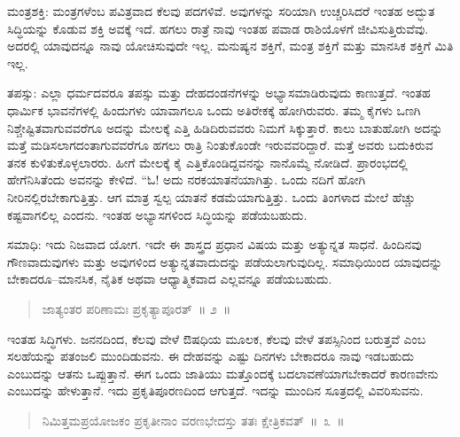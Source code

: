 \vspace{0.2cm}

ಮಂತ್ರಶಕ್ತಿ: ಮಂತ್ರಗಳೆಂಬ ಪವಿತ್ರವಾದ ಕೆಲವು ಪದಗಳಿವೆ. ಅವುಗಳನ್ನು ಸರಿಯಾಗಿ ಉಚ್ಚರಿಸಿದರೆ ಇಂತಹ ಅದ್ಭುತ ಸಿದ್ಧಿಯನ್ನು ಕೊಡುವ ಶಕ್ತಿ ಅವಕ್ಕೆ ಇದೆ. ಹಗಲು ರಾತ್ರೆ ನಾವು ಇಂತಹ ಪವಾಡ ರಾಶಿಯೊಳಗೆ ಜೀವಿಸುತ್ತಿರುವೆವು. ಅದರಲ್ಲಿ ಯಾವುದನ್ನೂ ನಾವು ಯೋಚಿಸುವುದೇ ಇಲ್ಲ. ಮನುಷ್ಯನ ಶಕ್ತಿಗೆ, ಮಂತ್ರ ಶಕ್ತಿಗೆ ಮತ್ತು ಮಾನಸಿಕ ಶಕ್ತಿಗೆ ಮಿತಿ ಇಲ್ಲ. 

\vspace{0.2cm}

ತಪಸ್ಸು: ಎಲ್ಲಾ ಧರ್ಮದವರೂ ತಪಸ್ಸು ಮತ್ತು ದೇಹದಂಡನೆಗಳನ್ನು ಅಭ್ಯಾಸಮಾಡಿರುವುದು ಕಾಣುತ್ತದೆ. ಇಂತಹ ಧಾರ್ಮಿಕ ಭಾವನೆಗಳಲ್ಲಿ ಹಿಂದುಗಳು ಯಾವಾಗಲೂ ಒಂದು ಅತಿರೇಕಕ್ಕೆ ಹೋಗಿರುವರು. ತಮ್ಮ ಕೈಗಳು ಒಣಗಿ ನಿಶ್ಚೇಷ್ಟಿತವಾಗುವವರೆಗೂ ಅದನ್ನು ಮೇಲಕ್ಕೆ ಎತ್ತಿ ಹಿಡಿದಿರುವವರು ನಿಮಗೆ ಸಿಕ್ಕುತ್ತಾರೆ. ಕಾಲು ಬಾತುಹೋಗಿ ಅದನ್ನು ಮತ್ತೆ ಮಡಿಸಲಾಗದಂತಾಗುವವರೆಗೂ ಹಗಲು ರಾತ್ರಿ ನಿಂತುಕೊಂಡೇ ಇರುವವರಿದ್ದಾರೆ. ಮತ್ತೆ ಅವರು ಬದುಕಿರುವ ತನಕ ಕುಳಿತುಕೊಳ್ಳಲಾರರು. ಹೀಗೆ ಮೇಲಕ್ಕೆ ಕೈ ಎತ್ತಿಕೊಂಡಿದ್ದವನನ್ನು ನಾನೊಮ್ಮೆ ನೋಡಿದೆ. ಪ್ರಾರಂಭದಲ್ಲಿ ಹೇಗೆನಿಸಿತೆಂದು ಅವನನ್ನು ಕೇಳಿದೆ. “ಓ! ಅದು ನರಕಯಾತನೆಯಾಗಿತ್ತು. ಒಂದು ನದಿಗೆ ಹೋಗಿ ನೀರಿನಲ್ಲಿರಬೇಕಾಗುತ್ತಿತ್ತು. ಆಗ ಮಾತ್ರ ಸ್ವಲ್ಪ ಯಾತನೆ ಕಡಮೆಯಾಗುತ್ತಿತ್ತು. ಒಂದು ತಿಂಗಳಾದ ಮೇಲೆ ಹೆಚ್ಚು ಕಷ್ಟವಾಗಲಿಲ್ಲ ಎಂದನು. ಇಂತಹ ಅಭ್ಯಾಸಗಳಿಂದ ಸಿದ್ಧಿಯನ್ನು ಪಡೆಯಬಹುದು. 

\vspace{0.2cm}

ಸಮಾಧಿ: ಇದು ನಿಜವಾದ ಯೋಗ. ಇದೇ ಈ ಶಾಸ್ತ್ರದ ಪ್ರಧಾನ ವಿಷಯ ಮತ್ತು ಅತ್ಯುನ್ನತ ಸಾಧನೆ. ಹಿಂದಿನವು ಗೌಣವಾದುವುಗಳು ಮತ್ತು ಅವುಗಳಿಂದ ಅತ್ಯುನ್ನತವಾದುದನ್ನು ಪಡೆಯಲಾಗುವುದಿಲ್ಲ. ಸಮಾಧಿಯಿಂದ ಯಾವುದನ್ನು ಬೇಕಾದರೂ–ಮಾನಸಿಕ, ನೈತಿಕ ಅಥವಾ ಆಧ್ಯಾತ್ಮಿಕವಾದ ಎಲ್ಲವನ್ನೂ ಪಡೆಯಬಹುದು. 

\newpage

\begin{verse}
ಜಾತ್ಯಂತರ ಪರಿಣಾಮಃ ಪ್ರಕೃತ್ಯಾಪೂರತ್​~॥ ೨~॥
\end{verse}

\vspace{-0.4cm}


\vspace{0.2cm}

ಇಂತಹ ಸಿದ್ಧಿಗಳು. ಜನನದಿಂದ, ಕೆಲವು ವೇಳೆ ಔಷಧಿಯ ಮೂಲಕ, ಕೆಲವು ವೇಳೆ ತಪಸ್ಸಿನಿಂದ ಬರುತ್ತವೆ ಎಂಬ ಸಲಹೆಯನ್ನು ಪತಂಜಲಿ ಮುಂದಿಡುವನು. ಈ ದೇಹವನ್ನು ಎಷ್ಟು ದಿನಗಳು ಬೇಕಾದರೂ ನಾವು ಇಡಬಹುದು ಎಂಬುದನ್ನು ಆತನು ಒಪ್ಪುತ್ತಾನೆ. ಈಗ ಒಂದು ಜಾತಿಯು ಮತ್ತೊಂದಕ್ಕೆ ಬದಲಾವಣೆಯಾಗಬೇಕಾದರೆ ಕಾರಣವೇನು ಎಂಬುದನ್ನು ಹೇಳುತ್ತಾನೆ. ಇದು ಪ್ರಕೃತಿಪೂರಣದಿಂದ ಆಗುತ್ತದೆ. ಇದನ್ನು ಮುಂದಿನ ಸೂತ್ರದಲ್ಲಿ ವಿವರಿಸುವನು. 

\vspace{-0.1cm}

\begin{verse}
ನಿಮಿತ್ತಮಪ್ರಯೋಜಕಂ ಪ್ರಕೃತೀನಾಂ ವರಣಭೇದಸ್ತು ತತಃ ಕ್ಷೇತ್ರಿಕವತ್​~॥~೩~॥
\end{verse}

